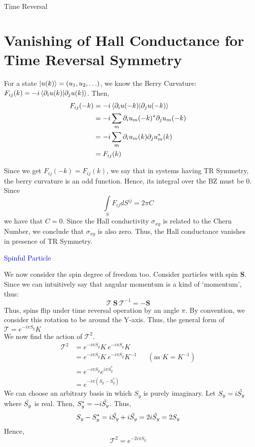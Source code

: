 \documentclass[12pt, oneside, listof=totoc,dvipsnames]{scrbook}
\begin{document}
\begin{chapter}{Time Reversal}
		
		
		
		
		
		\section{Vanishing of Hall Conductance for Time Reversal Symmetry}
		For a state $\ket{u(k)}=(u_1, u_2, \ldots)$, we  know the Berry Curvature: $F_{ij}(k) = -i\braket{\partial_i u(k)|\partial_j u(k)}$.
		Then,
		\begin{align*}
			F_{ij}(-k) &= -i\braket{\partial_i u(-k)|\partial_j u(-k)}\\
			&= -i\sum \limits_m \partial_i u_m(-k)^* \partial_j u_m(-k)\\
			&= -i\sum \limits_m \partial_i u_m(k) \partial_j u_m^*(k)\\
			&=F_{ij}(k)
		\end{align*}
		
		\noindent
		Since we get $F_{ij}(-k) = F_{ij}(k)$, we say that in systems having TR Symmetry, the berry curvature is an odd function. Hence, its integral over the BZ must be 0. 
		Since $$ \int \limits_S F_{ij} dS^{ij} = 2\pi C$$ we have that $C=0$. Since the Hall conductivity $\sigma_{xy}$ is related to the Chern Number, we conclude that $\sigma_{xy}$ is also zero. Thus, the Hall conductance vanishes in presence of TR Symmetry.
		
		\begin{center}
			\Large  \textcolor{blue}{Spinful Particle}\\
			
		\end{center}
		\noindent
		We now consider the spin degree of freedom too. Consider particles with spin $\mathbf{S}$. Since we can intuitively say that angular momentum is a kind of `momentum', thus: $$\mathcal{T} \ \mathbf{S}\  \mathcal{T}^{-1} = -\mathbf{S}$$ Thus, spins flip under time reversal operation by an angle $\pi$. By convention, we consider this rotation to be around the Y-axis. Thus, the general form of $\mathcal{T}= e^{-i\pi S_y}K$\\[0.2cm]
		We now find the action of $\mathcal{T}^2.$
		\begin{align*}
			\mathcal{T}^2 &=e^{-i\pi S_y}K\ e^{-i\pi S_y}K\\
			&=e^{-i\pi S_y}K\ e^{-i\pi S_y}K^{-1} &&(\text{as $K=K^{-1}$})\\
			&=e^{-i\pi S_y}e^{i\pi S^*_y}\\
			&=e^{-i\pi (S_y-S^*_y)}
		\end{align*}
		We can choose an arbitrary basis in which $S_y$ is purely imaginary. Let $S_y= i\Tilde{S_y}$ where $\Tilde{S_y}$ is real. Then, $S^*_y= -i\Tilde{S_y}$. Thus, $$S_y-S^*_y =  i\Tilde{S_y}+ i\Tilde{S_y}=2 i\Tilde{S_y}=2S_y$$
		Hence,  $$ \boxed{\mathcal{T}^2 = e^{-2i\pi S_y}}$$
		

\end{chapter}
\end{document}
